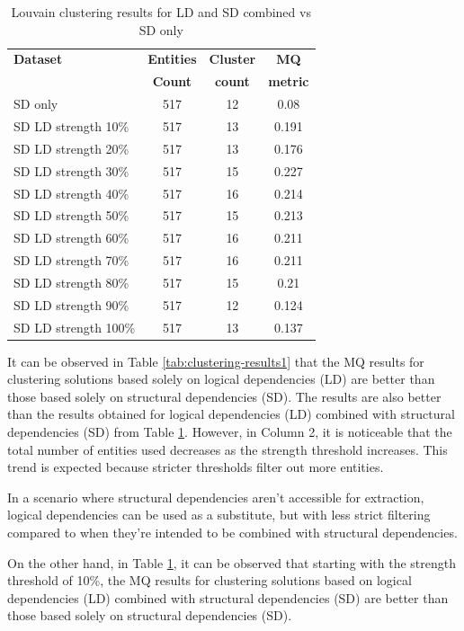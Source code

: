 \documentclass[conference, a4paper]{IEEEtran}
\begin{document}
\begin{table}[htbp]
  \centering
  \caption{Louvain clustering results for LD and SD combined vs SD only}
  \label{tab:clustering-results2}
  \begin{tabular}{lc|c|c}
    \toprule
    \textbf{Dataset} & \textbf{Entities} & \textbf{Cluster} & \textbf{MQ } \\
    & \textbf{Count} & \textbf{count} &  \textbf{metric} \\
    \midrule
    SD only & 517 & 12 & 0.08 \\
    \midrule
    SD LD strength 10\% & 517 & 13 & 0.191 \\
    SD LD strength 20\% & 517 & 13 & 0.176 \\
    SD LD strength 30\% & 517 & 15 & 0.227 \\
    SD LD strength 40\% & 517 & 16 & 0.214 \\
    SD LD strength 50\% & 517 & 15 & 0.213 \\
    SD LD strength 60\% & 517 & 16 & 0.211 \\
    SD LD strength 70\% & 517 & 16 & 0.211 \\
    SD LD strength 80\% & 517 & 15 & 0.21 \\
    SD LD strength 90\% & 517 & 12 & 0.124 \\
    SD LD strength 100\% & 517 & 13 & 0.137 \\
    \bottomrule
  \end{tabular}
\end{table}

It can be observed in Table \ref{tab:clustering-results1} that the MQ results for clustering solutions based solely on logical dependencies (LD) are better than those based solely on structural dependencies (SD). The results are also better than the results obtained for logical dependencies (LD) combined with structural dependencies (SD) from Table \ref{tab:clustering-results2}. However, in Column 2, it is noticeable that the total number of entities used decreases as the strength threshold increases. This trend is expected because stricter thresholds filter out more entities.

In a scenario where structural dependencies aren't accessible for extraction, logical dependencies can be used as a substitute, but with less strict filtering compared to when they're intended to be combined with structural dependencies.

On the other hand, in Table \ref{tab:clustering-results2}, it can be observed that starting with the strength threshold of 10\%, the MQ results for clustering solutions based on logical dependencies (LD) combined with structural dependencies (SD) are better than those based solely on structural dependencies (SD).
\end{document}
